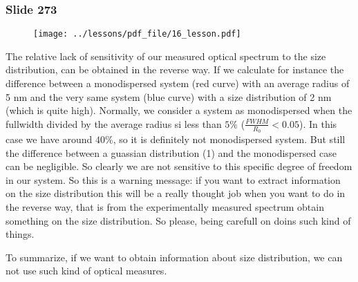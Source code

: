 \documentclass[../main/main.tex]{subfiles}
\begin{document}
\newpage

\subsubsection{Slide 273}

\begin{figure}[h!]
\centering
\texttt{[image: ../lessons/pdf\_file/16\_lesson.pdf]}
\end{figure}

The relative lack of sensitivity of our measured optical spectrum to the size distribution, can be obtained in the reverse way.
If we calculate for instance the difference between a monodispersed system (red curve) with an average radius of 5 nm and the very same system (blue curve) with a size distribution of 2 nm (which is quite high).
Normally, we consider a system as monodispersed when the fullwidth divided by the average radius si less than \( 5\% \) ($\frac{FWHM}{R_0}<0.05$).
In this case we have around \( 40\% \), so it is definitely not monodispersed system.
But still the difference between a guassian distribution (1) and the monodispersed case can be negligible. So clearly we are not sensitive to this specific degree of freedom in our system.
So this is a warning message: if you want to extract information on the size distribution this will be a really thought job when you want to do in the reverse way, that is from the experimentally measured spectrum obtain something on the size distribution. So please, being carefull on doins such kind of things.

\begin{remark}
To summarize, if we want to obtain information about size distribution, we can not use such kind of optical measures.
\end{remark}



\clearpage
\end{document}

